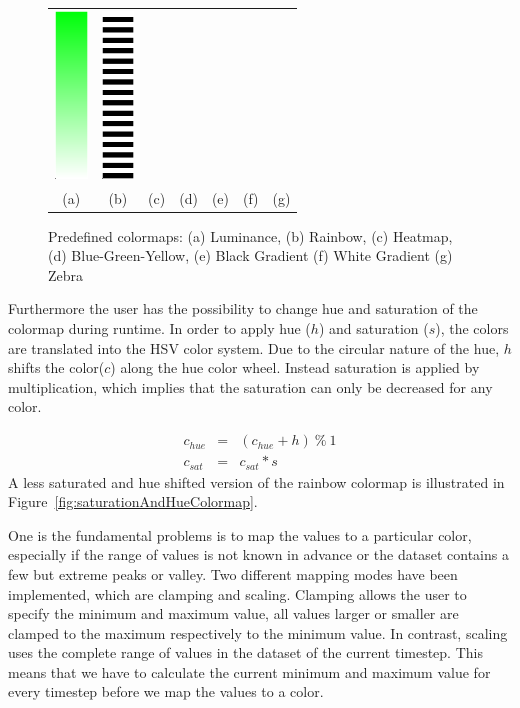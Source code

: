 \begin{figure}[htbp]
\begin{tabular}{ccccccc}
      \includegraphics[height=1.75in]{figures/colormaps/whiteGradient.png}&
      \includegraphics[height=1.75in]{figures/colormaps/zebra.png}\\
    (a)&(b)&(c)&(d)&(e)&(f)&(g)\\
    \end{tabular}
    \caption{Predefined colormaps: (a) Luminance, (b) Rainbow, (c) Heatmap, (d)  Blue-Green-Yellow, (e) Black Gradient (f) White Gradient (g) Zebra}
    \label{fig:colormaps}
\end{figure}


Furthermore the user has the possibility to change hue and saturation of the  colormap during runtime. In order to apply hue ($h$) and saturation ($s$), the colors are translated into the HSV color system. Due to the circular nature of the hue, $h$ shifts the color($c$) along the hue color wheel. Instead saturation is applied by multiplication, which implies that the saturation can only be decreased for any color.

\begin{eqnarray*}
c_{hue} &=&  (c_{hue} + h)~\%~1\\
c_{sat} &=& c_{sat} * s
\end{eqnarray*}
A less saturated and hue shifted version of the rainbow colormap is illustrated in Figure~\ref{fig:saturationAndHueColormap}.

One is the fundamental problems is to map the values to a particular color, especially if the range of values is not known in advance or the dataset contains a few but extreme peaks or valley. Two different mapping modes have been implemented, which are clamping and scaling. Clamping allows the user to specify the minimum and maximum value, all values larger or smaller are clamped to the maximum respectively to the minimum value. 
In contrast, scaling uses the complete range of values in the dataset of the current timestep. This means that we have to calculate the current minimum and maximum value for every timestep before we map the values to a color.

